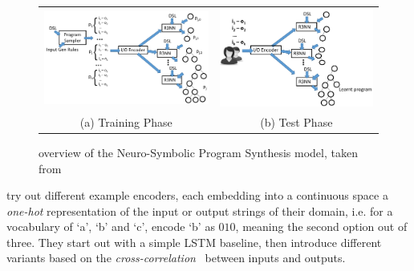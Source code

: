 \documentclass{article}
\begin{document}
\begin{figure}[h]
    \begin{tabular}{c|c}
        \begin{minipage}{0.5\linewidth}
            \includegraphics[scale=0.3]{figures/nsps_training.pdf}
        \end{minipage}
        &
        \begin{minipage}{0.5\linewidth}
            \includegraphics[scale=0.3]{figures/nsps_test.pdf}
        \end{minipage}
        \\
        (a) Training Phase & (b) Test Phase
    \end{tabular}
    \caption{overview of the Neuro-Symbolic Program Synthesis model, taken from \citep{nsps}}
    \label{nsps}
\end{figure}

\citet{nsps} try out different example encoders,
each embedding into a continuous space a \emph{one-hot} representation of the input or output strings of their domain,
i.e. for a vocabulary of `a', `b' and `c', encode `b' as $010$,
meaning the second option out of three.
They start out with a simple LSTM baseline,
then introduce different variants based on the \emph{cross-correlation}~\citep{bracewell1986fourier} between inputs and outputs.
\end{document}
